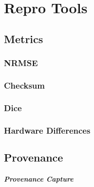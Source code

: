 \chapter{Repro Tools}
\section{Metrics}
\subsection{NRMSE}
\subsection{Checksum}
\subsection{Dice}
\subsection{Hardware Differences}

\section{Provenance}
\paragraph{Provenance Capture}




